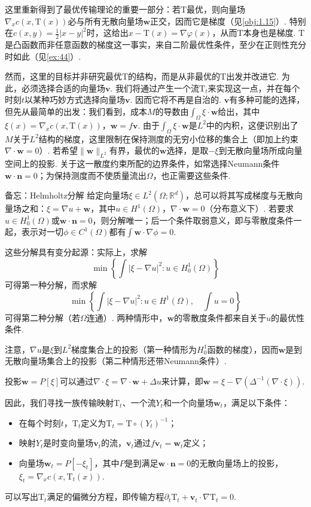 这里重新得到了最优传输理论的重要一部分：若$\mathrm T$最优，则向量场$\nabla_xc(x,\mathrm T(x))$必与所有无散向量场$\mathbf w$正交，因而它是梯度（见\autoref{obj:1.15}）. 特别在$c(x,y)=\frac12|x-y|^2$时，这给出$x-\mathrm T(x)=\nabla\varphi(x)$，从而$\mathrm T$本身也是梯度. $\mathrm T$是凸函数而非任意函数的梯度这一事实，来自二阶最优性条件，至少在正则性充分时如此（见\autoref{ex:44}）.

然而，这里的目标并非研究最优$\mathrm T$的结构，而是从非最优的$\mathrm T$出发并改进它. 为此，必须选择合适的向量场$\mathbf v$. 我们将通过产生一个流$\mathrm T_t$来实现这一点，并在每个时刻$t$以某种巧妙方式选择向量场$\mathbf v$. 因而它将不再是自治的. $\mathbf v$有多种可能的选择，但先从最简单的出发：我们看到，成本$M$的导数由$\int_\Omega\xi\cdot\mathbf w$给出，其中$\xi(x)=\nabla_xc(x,\mathrm T(x))$，$\mathbf w=f\mathbf v$. 由于$\int_\Omega\xi\cdot\mathbf w$是$L^2$中的内积，这便识别出了$M$关于$L^2$结构的梯度，这里限制在保持测度的无穷小位移的集合上（即加上约束$\nabla\cdot\mathbf w=0$）. 若希望$\|\mathbf w\|_{L^2}$有界，最优的$\mathbf w$选择，是取$-\xi$到无散向量场所成向量空间上的投影. 关于这一散度约束所配的边界条件，如常选择Neumann条件$\mathbf w\cdot\mathbf n=0$；为保持测度而不使质量流出$\Omega$，也正需要这些条件.

\begin{sourcebox}{备忘：Helmholtz分解}\label{box:6.2}
给定向量场$\xi\in L^2(\Omega;\mathbb R^d)$，总可以将其写成梯度与无散向量场之和：$\xi=\nabla u+\mathbf w$，其中$u\in H^1(\Omega)$，$\nabla\cdot\mathbf w=0$（分布意义下）. 若要求$u\in H_0^1(\Omega)$或$\mathbf w\cdot\mathbf n=0$，则分解唯一；后一个条件取弱意义，即与零散度条件一起，表示对一切$\phi\in C^1(\Omega)$都有$\int\mathbf w\cdot\nabla\phi=0$.

这些分解具有变分起源：实际上，求解
\[
\min\left\{\int|\xi-\nabla u|^2:u\in H_0^1(\Omega)\right\}
\]
可得第一种分解，而求解
\[
\min\left\{\int|\xi-\nabla u|^2:u\in H^1(\Omega),\quad\int u=0\right\}
\]
可得第二种分解（若$\Omega$连通）. 两种情形中，$\mathbf w$的零散度条件都来自关于$u$的最优性条件.

注意，$\nabla u$是$\xi$到$L^2$梯度集合上的投影（第一种情形为$H_0^1$函数的梯度），因而$\mathbf w$是到无散向量场集合上的投影（第二种情形还带Neumann条件）.

投影$\mathbf w=P[\xi]$可以通过$\nabla\cdot\xi=\nabla\cdot\mathbf w+\Delta u$来计算，即$\mathbf w=\xi-\nabla(\Delta^{-1}(\nabla\cdot\xi))$.
\end{sourcebox}

因此，我们寻找一族传输映射$\mathrm T_t$、一个流$Y_t$和一个向量场$\mathbf w_t$，满足以下条件：
\begin{itemize}
\item 在每个时刻$t$，$\mathrm T_t$定义为$\mathrm T_t=\mathrm T\circ(Y_t)^{-1}$；
\item 映射$Y_t$是时变向量场$\mathbf v_t$的流，$\mathbf v_t$通过$f\mathbf v_t=\mathbf w_t$定义；
\item 向量场$\mathbf w_t=P[-\xi_t]$，其中$P$是到满足$\mathbf w\cdot\mathbf n=0$的无散向量场上的投影，$\xi_t=\nabla_xc(x,\mathrm T_t(x))$.
\end{itemize}
可以写出$\mathrm T_t$满足的偏微分方程，即传输方程$\partial_t\mathrm T_t+\mathbf v_t\cdot\nabla\mathrm T_t=0$.

